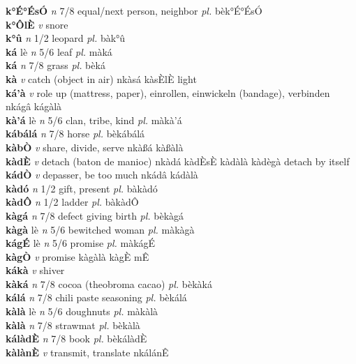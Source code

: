 \documentclass{article}
\begin{document}
{\bf k°É°ÉsÓ}  {\it n} 7/8 equal/next person, neighbor {\it pl.} bèk°É°ÉsÓ         \\ 
{\bf k°ÔlÈ}  {\it v} snore         \\ 
{\bf k°û}  {\it n} 1/2 leopard {\it pl.} bàk°û         \\ 
{\bf ká} lè {\it n} 5/6 leaf {\it pl.} màká         \\ 
{\bf ká}  {\it n} 7/8 grass {\it pl.} bèká         \\ 
{\bf kà}  {\it v} catch (object in air)   nkàsá kàsÈlÈ light     \\ 
{\bf ká'à}  {\it v} role up (mattress, paper), einrollen, einwickeln (bandage), verbinden   nkágâ   kágàlà   \\ 
{\bf kà'á} lè {\it n} 5/6 clan, tribe, kind {\it pl.} màkà'á         \\ 
{\bf kábálá}  {\it n} 7/8 horse {\it pl.} bèkábálá         \\ 
{\bf kàbÒ}  {\it v} share, divide, serve   nkàßá   kàßàlà   \\ 
{\bf kàdÈ}  {\it v} detach (baton de manioc)   nkàdá  kàdÈsÈ kàdàlà kàdègà detach by itself  \\ 
{\bf kádÒ}  {\it v} depasser, be too much   nkádâ   kádàlà   \\ 
{\bf kàdó}  {\it n} 1/2 gift, present {\it pl.} bàkàdó         \\ 
{\bf kàdÔ}  {\it n} 1/2 ladder {\it pl.} bàkàdÔ         \\ 
{\bf kàgá}  {\it n} 7/8 defect giving birth {\it pl.} bèkàgá         \\ 
{\bf kàgà} lè {\it n} 5/6 bewitched woman {\it pl.} màkàgà         \\ 
{\bf kágÉ} lè {\it n} 5/6 promise {\it pl.} màkágÉ         \\ 
{\bf kàgÒ}  {\it v} promise      kàgàlà  kàgÈ mÊ  \\ 
{\bf kákà}  {\it v} shiver         \\ 
{\bf kàká}  {\it n} 7/8 cocoa (theobroma cacao) {\it pl.} bèkàká         \\ 
{\bf kálá}  {\it n} 7/8 chili paste seasoning {\it pl.} bèkálá         \\ 
{\bf kàlà} lè {\it n} 5/6 doughnuts {\it pl.} màkàlà         \\ 
{\bf kàlà}  {\it n} 7/8 strawmat {\it pl.} bèkàlà         \\ 
{\bf kálàdÈ}  {\it n} 7/8 book {\it pl.} bèkálàdÈ         \\ 
{\bf kàlànÈ}  {\it v} transmit, translate   nkálánÊ      \\ 
\end{document}
